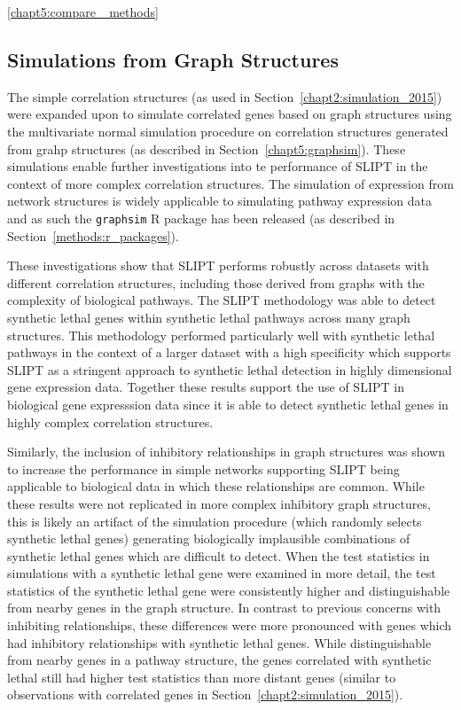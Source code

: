 \ref{chapt5:compare_ methods}

\subsection{Simulations from Graph Structures}

The simple correlation structures (as used in Section~\ref{chapt2:simulation_2015}) were expanded upon to simulate correlated genes based on graph structures using the multivariate normal simulation procedure on correlation structures generated from grahp structures (as described in Section~\ref{chapt5:graphsim}). These simulations enable further investigations into te performance of \gls{SLIPT} in the context of more complex correlation structures. The simulation of expression from network structures is widely applicable to simulating pathway expression data and as such the \texttt{graphsim} R package has been released (as described in Section~\ref{methods:r_packages}).

These investigations show that \gls{SLIPT} performs robustly across datasets with different correlation structures, including those derived from graphs with the complexity of biological pathways. The \gls{SLIPT} methodology was able to detect synthetic lethal genes within synthetic lethal pathways across many graph structures. This methodology performed particularly well with synthetic lethal pathways in the context of a larger dataset with a high specificity which supports \gls{SLIPT} as a stringent approach to synthetic lethal detection in highly dimensional gene expression data. Together these results support the use of \gls{SLIPT} in biological gene expresssion data since it is able to detect synthetic lethal genes in highly complex correlation structures.

Similarly, the inclusion of inhibitory relationships in graph structures was shown to increase the performance in simple networks supporting \gls{SLIPT} being applicable to biological data in which these relationships are common. While these results were not replicated in more complex inhibitory graph structures, this is likely an artifact of the simulation procedure (which randomly selects synthetic lethal genes) generating biologically implausible combinations of synthetic lethal genes which are difficult to detect. When the test statistics in simulations with a synthetic lethal gene were examined in more detail, the test statistics of the synthetic lethal gene were consistently higher and distinguishable from nearby genes in the graph structure. In contrast to previous concerns with inhibiting relationships, these differences were more pronounced with genes which had inhibitory relationships with synthetic lethal genes. While distinguishable from nearby genes in a pathway structure, the genes correlated with synthetic lethal still had higher test statistics than more distant genes (similar to observations with correlated genes in Section~\ref{chapt2:simulation_2015}).

